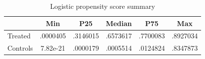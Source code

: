 \begin{table}[htbp]\centering
\caption{Logistic propensity score summary}
\begin{tabular}{l*{5}{c}}
\hline\hline
            &         Min&         P25&      Median&         P75&         Max\\
\hline
Treated     &    .0000405&    .3146015&    .6573617&    .7700083&    .8927034\\
Controls    &    7.82e-21&    .0000179&    .0005514&    .0124824&    .8347873\\
\hline\hline
\end{tabular}
\end{table}
